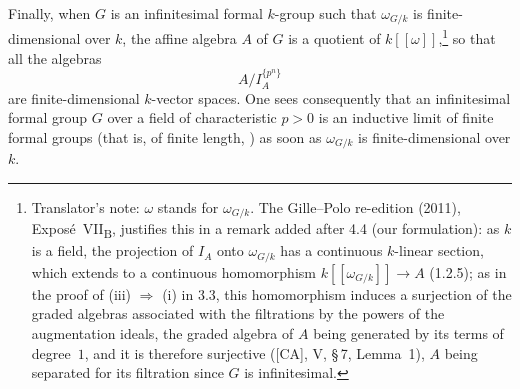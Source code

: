 Finally, when \(G\) is an infinitesimal formal \(k\)-group such that
\(\omega_{G/k}\) is finite-dimensional over \(k\), the affine algebra
\(A\) of \(G\) is a quotient of \(k[[\omega]]\),\footnote{Translator's note: \(\omega\) stands for
\(\omega_{G/k}\). The Gille--Polo re-edition (2011), Expos\'e~VII\textsubscript{B}, justifies this in a remark
added after 4.4 (our formulation): as \(k\) is a field, the projection of \(I_A\) onto \(\omega_{G/k}\) has a
continuous \(k\)-linear section, which extends to a continuous homomorphism \(k[[\omega_{G/k}]]\to A\)
(1.2.5); as in the proof of \textup{(iii)} \(\Rightarrow\) \textup{(i)} in 3.3, this homomorphism induces a
surjection of the graded algebras associated with the filtrations by the powers of the augmentation ideals,
the graded algebra of \(A\) being generated by its terms of degree~\(1\), and it is therefore surjective
\textup{([CA], V, \S\,7, Lemma~1)}, \(A\) being separated for its filtration since \(G\) is infinitesimal.} so
that all the
algebras
\[
  A/I_A^{\{p^n\}}
\]
are finite-dimensional \(k\)-vector spaces. One sees consequently
that an infinitesimal formal group \(G\) over a field of
characteristic \(p>0\) is an inductive limit of finite formal groups
\textup{(that is, of finite length, )} as soon as
\(\omega_{G/k}\) is finite-dimensional over \(k\).
